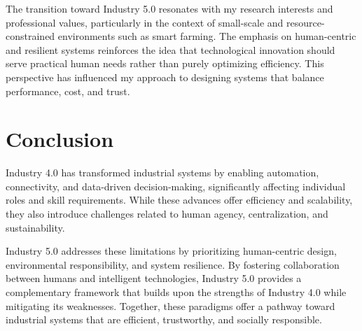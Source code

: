 \documentclass[conference]{IEEEtran}
\begin{document}
The transition toward Industry 5.0 resonates with my research interests and professional values, particularly in the context of small-scale and resource-constrained environments such as smart farming. The emphasis on human-centric and resilient systems reinforces the idea that technological innovation should serve practical human needs rather than purely optimizing efficiency. This perspective has influenced my approach to designing systems that balance performance, cost, and trust.

\section{Conclusion}
Industry 4.0 has transformed industrial systems by enabling automation, connectivity, and data-driven decision-making, significantly affecting individual roles and skill requirements. While these advances offer efficiency and scalability, they also introduce challenges related to human agency, centralization, and sustainability.

Industry 5.0 addresses these limitations by prioritizing human-centric design, environmental responsibility, and system resilience. By fostering collaboration between humans and intelligent technologies, Industry 5.0 provides a complementary framework that builds upon the strengths of Industry 4.0 while mitigating its weaknesses. Together, these paradigms offer a pathway toward industrial systems that are efficient, trustworthy, and socially responsible.
\end{document}
